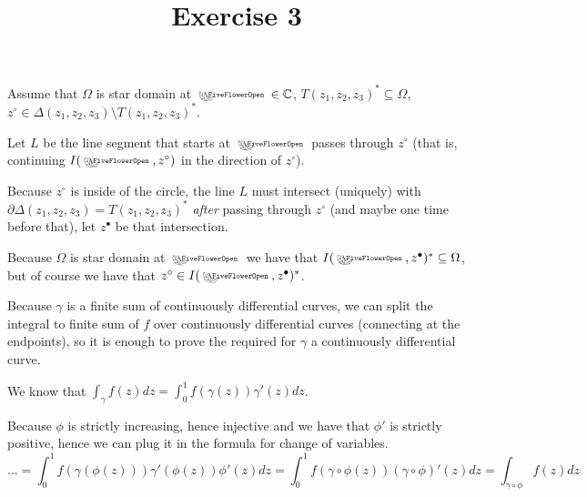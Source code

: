 

\usepackage{skak}
\usepackage{relsize}
\usepackage{graphicx}
\usepackage{mathtools}

\usepackage{textcomp}
\usepackage{bbding}

\usepackage{soul}

\newcommand{\flower}{\text{\scalebox{0.75}{\raisebox{-0.7ex}{
				\rotatebox{90}{\textleaf}\hspace{-0.3em}
				\scalebox{0.7}{\textleaf}\hspace{-1.35em}
				\raisebox{1ex}{\scalebox{0.8}{\FiveFlowerOpen}}
}}}}
\newcommand{\ei}[1]{e^{i#1}}


\title{Exercise 3}

\maketitle
\begin{cExercise}[][][author]
	Assume that $\Omega$ is star domain at $\flower\in\mathbb C$, $T(z_1,z_2,z_3)^*\subseteq \Omega$, $z^\circ\in \Delta(z_1,z_2,z_3)\setminus T(z_1,z_2,z_3)^*$.
	
	Let $L$ be the line segment that starts at $\flower$ passes through $z^\circ$ (that is, continuing $I(\flower,z^\circ)$ in the direction of $z^\circ$).
	
	Because $z^\circ$ is inside of the circle, the line $L$ must intersect (uniquely) with $\partial \Delta(z_1,z_2,z_3)=T(z_1,z_2,z_3)^*$ \textit{after} passing through $z^\circ$ (and maybe one time before that), let $z^\bullet$ be that intersection.
	
	Because $\Omega$ is star domain at $\flower$ we have that $I(\flower, z^\bullet)^*\subseteq \Omega$, but of course we have that $z^\circ\in I(\flower, z^\bullet)^*$.
\end{cExercise}
\begin{cExercise}
	Because $\gamma$ is a finite sum of continuously differential curves, we can split the integral to finite sum of $f$ over continuously differential curves (connecting at the endpoints), so it is enough to prove the required for $\gamma$ a continuously differential curve.
	
	We know that $\int_\gamma f(z)dz=\int_0^1 f(\gamma(z))\gamma'(z)dz$.
	
	Because $\phi$ is strictly increasing, hence injective and we have that $\phi'$ is strictly positive, hence we can plug it in the formula for change of variables.
	$$...=\int_0^1f(\gamma(\phi(z)))\gamma'(\phi(z))\phi'(z)dz=\int_0^1f(\gamma\circ\phi(z))(\gamma\circ\phi)'(z)dz=\int_{\gamma\circ\phi}f(z)dz$$
\end{cExercise}
